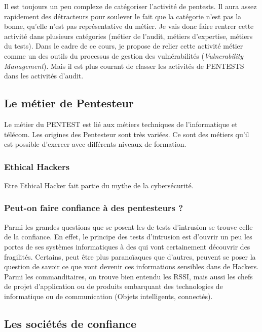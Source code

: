 Il est toujours un peu complexe de catégoriser l'activité de pentests. Il aura assez rapidement des détracteurs pour soulever le fait que la catégorie n'est pas la bonne, qu'elle n'est pas représentative du métier. 
Je vais donc faire rentrer cette activité dans plusieurs catégories (métier de l'audit, métiers d'expertise, métiers du tests).
Dans le cadre de ce cours, je propose de relier cette activité métier comme un des outils du processus de gestion des vulnérabilités (\emph{Vulnerability Management}).  Mais il est plus courant de  classer les activités de PENTESTS dans les activités d'audit.

\subsection{Le métier de Pentesteur}

Le métier du PENTEST est  lié aux métiers techniques de l'informatique et télécom. Les origines des Pentesteur sont très variées.
Ce sont des métiers qu'il est possible d'exercer avec différents niveaux de formation. 

\subsubsection{ Ethical Hackers}
Etre Ethical Hacker fait partie du mythe de la cybersécurité.

\subsubsection{Peut-on faire confiance à des pentesteurs ?}
Parmi les grandes questions que se posent les  de tests d'intrusion se trouve celle de la confiance.
En effet, le principe des tests d'intrusion est d'ouvrir un peu les portes de ses systèmes informatiques à des  qui vont certainement découvrir des fragilités.
Certains, peut être plus paranoïaques que d'autres, peuvent se poser la question de savoir ce que vont devenir ces informations sensibles dans  de Hackers.
Parmi les commanditaires, on trouve bien entendu les RSSI, mais aussi les chefs de projet d'application ou de produits embarquant des technologies de informatique ou de communication (Objets intelligents, connectés).

\subsection{Les sociétés de confiance}

